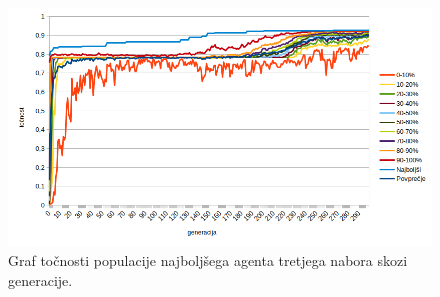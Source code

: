 
\begin{figure}[H]
    \begin{center}
        \includegraphics[width=13cm]{shuttle/3/acc}
    \end{center}
    \caption{Graf točnosti populacije najboljšega agenta tretjega nabora skozi generacije.}
    \label{fig:statlog_acc_3}
\end{figure}


